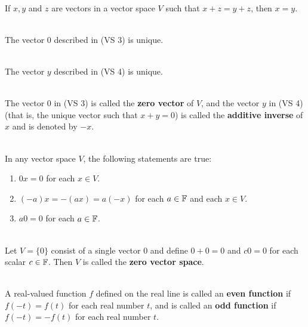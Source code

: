 \begin{theorem}
	\hfill\\
	If $x, y$ and $z$ are vectors in a vector space $V$ such that $x + z = y + z$, then $x = y$.
\end{theorem}

\begin{corollary}
	\hfill\\
	The vector $0$ described in (VS 3) is unique.
\end{corollary}

\begin{corollary}
	\hfill\\
	The vector $y$ described in (VS 4) is unique.
\end{corollary}

\begin{definition}
	\hfill\\
	The vector $0$ in (VS 3) is called the \textbf{zero vector} of $V$, and the vector $y$ in (VS 4) (that is, the unique vector such that $x + y = 0$) is called the \textbf{additive inverse} of $x$ and is denoted by $-x$.
\end{definition}

\begin{theorem}
	\hfill\\
	In any vector space $V$, the following statements are true:
	\begin{enumerate}
		\item $0x = 0$ for each $x \in V$.
		\item $(-a)x = -(ax) = a(-x)$ for each $a \in \mathbb{F}$ and each $x \in V$.
		\item $a0 = 0$ for each $a \in \mathbb{F}$.
	\end{enumerate}
\end{theorem}

\begin{definition}
	\hfill\\
	Let $V=\{0\}$ consist of a single vector $0$ and define $0 + 0 = 0$ and $c0 = 0$ for each scalar $c \in \mathbb{F}$. Then $V$ is called the \textbf{zero vector space}.
\end{definition}

\begin{definition}
	\hfill\\
	A real-valued function $f$ defined on the real line is called an \textbf{even function} if $f(-t) = f(t)$ for each real number $t$, and is called an \textbf{odd function} if $f(-t) = -f(t)$ for each real number $t$.
\end{definition}

